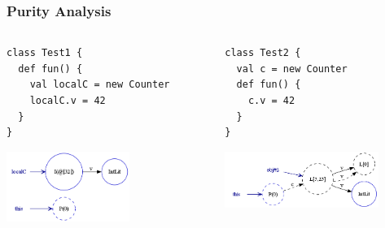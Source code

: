 \documentclass[hyperref={pdfpagelabels=false}]{beamer}
\begin{document}
\begin{frame}[fragile]
    \frametitle{Purity Analysis}
    \begin{columns}
      \begin{column}{0.4\textwidth}
\begin{lstlisting}
class Test1 {
  def fun() {
    val localC = new Counter
    localC.v = 42
  }
}
\end{lstlisting}
        \includegraphics[width=40mm]{images/purity_fun1_pt.png}
      \end{column}
      \begin{column}{0.6\textwidth}
\begin{lstlisting}
class Test2 {
  val c = new Counter
  def fun() {
    c.v = 42
  }
}
\end{lstlisting}
        \includegraphics[width=50mm]{images/purity_fun2_pt.png}

      \end{column}
    \end{columns}
\end{frame}
\end{document}
